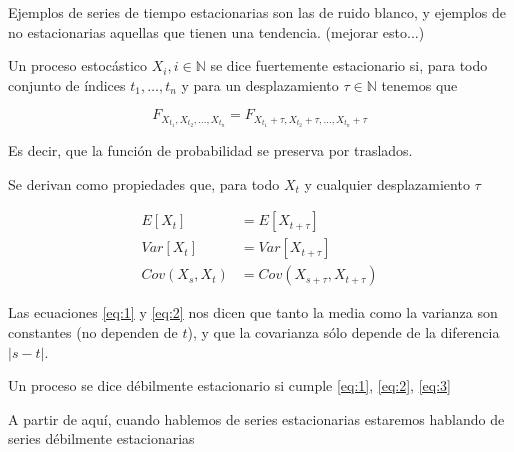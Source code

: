 Ejemplos de series de tiempo estacionarias son las de ruido blanco, y ejemplos de no estacionarias aquellas que tienen una tendencia. (mejorar esto...)

\begin{definicion}
Un proceso estocástico $X_i, i \in \mathbb{N}$ se dice fuertemente estacionario si, para todo conjunto de índices $t_1, \ldots , t_n$ y para un desplazamiento $\tau \in \mathbb{N}$ tenemos que

\begin{displaymath}
    F_{X_{t_1}, X_{t_2}, \ldots , X_{t_n} } = F_{X_{t_1} + \tau, X_{t_2} + \tau, \ldots , X_{t_n} + \tau}
\end{displaymath}

Es decir, que la función de probabilidad se preserva por traslados.
\end{definicion}

Se derivan como propiedades que, para todo $X_t$ y cualquier desplazamiento $\tau$

\begin{align}
    E[X_t] &= E[X_{t + \tau}] \label{eq:1} \\
    Var[X_t] &= Var[X_{t + \tau}] \label{eq:2} \\
    Cov(X_s, X_t) &= Cov(X_{s+\tau}, X_{t + \tau}) \label{eq:3}
\end{align}

Las ecuaciones \ref{eq:1} y \ref{eq:2} nos dicen que tanto la media como la varianza son constantes (no dependen de $t$), y que la covarianza sólo depende de la diferencia $| s - t |$.


\begin{definicion}
    Un proceso se dice débilmente estacionario si cumple \ref{eq:1}, \ref{eq:2}, \ref{eq:3}
\end{definicion}

A partir de aquí, cuando hablemos de series estacionarias estaremos hablando de series débilmente estacionarias


